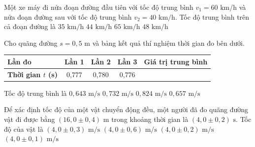 \begin{ex} Một xe máy đi nửa đoạn đường đầu tiên với tốc độ trung bình $v_1 = 60\text{ km/h}$ và nửa đoạn đường sau với tốc độ trung bình $v_2 = 40\text{ km/h}$. Tốc độ trung bình trên cả đoạn đường là
\choice
{$35\text{ km/h}$}
{$44\text{ km/h}$}
{$65\text{ km/h}$}
{\True $48\text{ km/h}$}
\end{ex}

\begin{ex} Cho quãng đường $s = 0{,}5\text{ m}$ và bảng kết quả thí nghiệm thời gian đo bên dưới.
\begin{center}
\renewcommand{\arraystretch}{1.2}
\begin{tabular}{|l|c|c|c|c|}
\hline
\textbf{Lần đo} & Lần 1 & Lần 2 & Lần 3 & Giá trị trung bình \\
\hline
\textbf{Thời gian $t$ (s)} & 0{,}777 & 0{,}780 & 0{,}776 & \\
\hline
\end{tabular}
\end{center}
Tốc độ trung bình là
\choice
{\True $0{,}643\text{ m/s}$}
{$0{,}732\text{ m/s}$}
{$0{,}824\text{ m/s}$}
{$0{,}657\text{ m/s}$}
\end{ex}

\begin{ex} Để xác định tốc độ của một vật chuyển động đều, một người đã đo quãng đường vật đi được bằng $(16{,}0 \pm 0{,}4)\text{ m}$ trong khoảng thời gian là $(4{,}0 \pm 0{,}2)\text{ s}$. Tốc độ của vật là
\choice
{\True $(4{,}0 \pm 0{,}3)\text{ m/s}$}
{$(4{,}0 \pm 0{,}6)\text{ m/s}$}
{$(4{,}0 \pm 0{,}2)\text{ m/s}$}
{$(4{,}0 \pm 0{,}1)\text{ m/s}$}
\end{ex}

